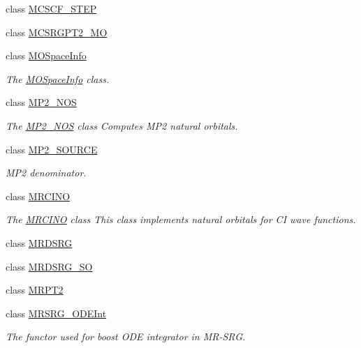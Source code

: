 \begin{DoxyCompactItemize}
\item 
class \mbox{\hyperlink{classforte_1_1_m_c_s_c_f__2_s_t_e_p}{M\+C\+S\+C\+F\+\_\+S\+T\+EP}}
\item 
class \mbox{\hyperlink{classforte_1_1_m_c_s_r_g_p_t2___m_o}{M\+C\+S\+R\+G\+P\+T2\+\_\+\+MO}}
\item 
class \mbox{\hyperlink{classforte_1_1_m_o_space_info}{M\+O\+Space\+Info}}
\begin{DoxyCompactList}\small\item\em The \mbox{\hyperlink{classforte_1_1_m_o_space_info}{M\+O\+Space\+Info}} class. \end{DoxyCompactList}\item 
class \mbox{\hyperlink{classforte_1_1_m_p2___n_o_s}{M\+P2\+\_\+\+N\+OS}}
\begin{DoxyCompactList}\small\item\em The \mbox{\hyperlink{classforte_1_1_m_p2___n_o_s}{M\+P2\+\_\+\+N\+OS}} class Computes M\+P2 natural orbitals. \end{DoxyCompactList}\item 
class \mbox{\hyperlink{classforte_1_1_m_p2___s_o_u_r_c_e}{M\+P2\+\_\+\+S\+O\+U\+R\+CE}}
\begin{DoxyCompactList}\small\item\em M\+P2 denominator. \end{DoxyCompactList}\item 
class \mbox{\hyperlink{classforte_1_1_m_r_c_i_n_o}{M\+R\+C\+I\+NO}}
\begin{DoxyCompactList}\small\item\em The \mbox{\hyperlink{classforte_1_1_m_r_c_i_n_o}{M\+R\+C\+I\+NO}} class This class implements natural orbitals for CI wave functions. \end{DoxyCompactList}\item 
class \mbox{\hyperlink{classforte_1_1_m_r_d_s_r_g}{M\+R\+D\+S\+RG}}
\item 
class \mbox{\hyperlink{classforte_1_1_m_r_d_s_r_g___s_o}{M\+R\+D\+S\+R\+G\+\_\+\+SO}}
\item 
class \mbox{\hyperlink{classforte_1_1_m_r_p_t2}{M\+R\+P\+T2}}
\item 
class \mbox{\hyperlink{classforte_1_1_m_r_s_r_g___o_d_e_int}{M\+R\+S\+R\+G\+\_\+\+O\+D\+E\+Int}}
\begin{DoxyCompactList}\small\item\em The functor used for boost O\+DE integrator in M\+R-\/\+S\+RG. \end{DoxyCompactList}\item 

\end{DoxyCompactItemize}
